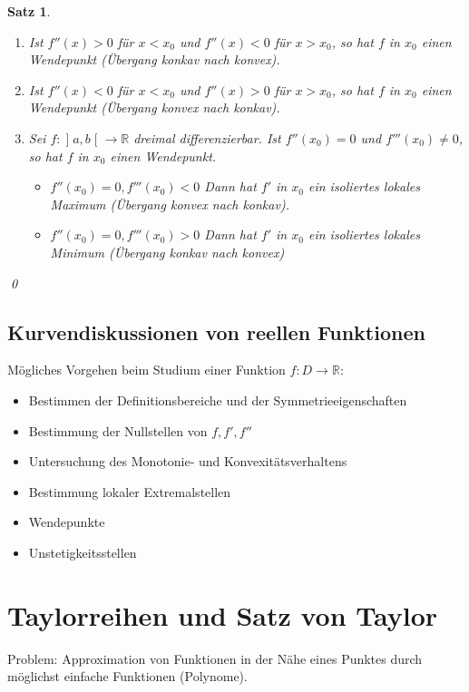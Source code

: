 \documentclass[ngerman,titlepage,twoside, parskip=half*]{scrreprt}
\newcommand*{\R}{\mathbb{R}}
\theoremstyle{plain}
\newtheorem{theorem}{Satz}[section]
\theoremstyle{definition}
\theoremstyle{remark}
\newcommand*{\bsofint}[1]{\mathopen{]}#1\mathclose{[}} %
\begin{document}
\begin{theorem}
\begin{enumerate}[(i)]
      \begin{enumerate}[(1)]
	\item Ist $f''(x)>0$ für $x<x_0$ und $f''(x)<0$ für $x>x_0$, so
	  hat $f$ in $x_0$ einen Wendepunkt (Übergang konkav nach konvex).
	\item Ist $f''(x)<0$ für $x<x_0$ und $f''(x)>0$ für $x>x_0$, so
	  hat $f$ in  $x_0$ einen Wendepunkt (Übergang konvex nach konkav).
	\item Sei $f\colon\bsofint{a,b}\rightarrow\R$ dreimal differenzierbar. Ist
	  $f''(x_0)=0$ und $f'''(x_0)\neq 0$, so hat $f$ in $x_0$
	  einen Wendepunkt.
	  \begin{itemize}
	    \item $f''(x_0)=0, f'''(x_0)<0$ Dann hat $f'$ in $x_0$ ein
	      isoliertes lokales Maximum (Übergang konvex nach konkav).
	    \item $f''(x_0)=0, f'''(x_0)>0$ Dann hat $f'$ in $x_0$ ein
	      isoliertes lokales Minimum (Übergang konkav nach konvex)
	  \end{itemize}
      \end{enumerate}
  \end{enumerate}
  \qed
\end{theorem}

\subsection{Kurvendiskussionen von reellen Funktionen}
Mögliches Vorgehen beim Studium einer Funktion $f\colon D\rightarrow\R$:
\begin{itemize}
  \item Bestimmen der Definitionsbereiche und der Symmetrieeigenschaften
  \item Bestimmung der Nullstellen von $f, f', f''$
  \item Untersuchung des Monotonie- und Konvexitätsverhaltens
  \item Bestimmung lokaler Extremalstellen
  \item Wendepunkte
  \item Unstetigkeitsstellen
\end{itemize}

\section{Taylorreihen und Satz von Taylor}
Problem: Approximation von Funktionen in der Nähe eines Punktes durch
möglichst einfache Funktionen (Polynome).
\end{document}
